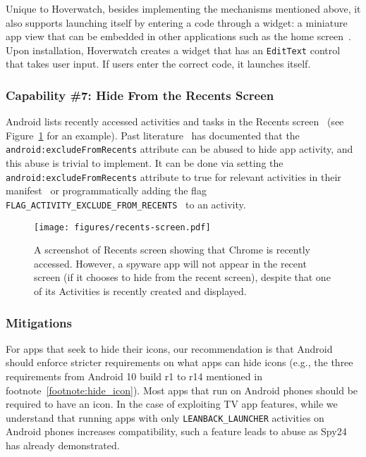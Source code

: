 \documentclass[sigconf,balance=false]{acmart}
\newcommand{\alex}[1]{\textcolor{chicagomaroon}{\noindent[AL: #1]}}
\newcommand{\alex}[1]{}
\begin{document}
Unique to Hoverwatch, besides implementing the mechanisms mentioned above, it also supports launching itself by entering a
code through a widget: a miniature app view that can be embedded in other
applications such as the home screen~\cite{Appwidge49:online}. Upon installation,
Hoverwatch creates a widget that has an \texttt{EditText} control that takes user input. If users
enter the correct code, it launches itself.



\subsubsection*{Capability \#7: Hide From the Recents Screen}

Android lists recently accessed activities and tasks in the Recents
screen~\cite{Recentss9:online} (see Figure~\ref{fig:recents_screen} for an
example). Past literature~\cite{shan2018self, zhou2020demystifying} has
documented that the \texttt{android:excludeFromRecents} attribute can be abused
to hide app activity, and this abuse is trivial to implement. It can be done via
setting the \texttt{android:excludeFromRecents} attribute to true for relevant
activities in their manifest~\cite{activity72:online} or programmatically adding
the flag
\texttt{FLAG\_ACTIVITY\_EXCLUDE\_FROM\_RECENTS}~\cite{IntentAn90:online} to an
activity.

\begin{figure}[t]
\centering
\texttt{[image: figures/recents-screen.pdf]}
\caption{A screenshot of Recents screen showing that Chrome is recently accessed. However, a spyware app will not appear in the recent screen (if it chooses to hide from the recent screen), despite that one of its Activities is recently created and displayed.}
\label{fig:recents_screen}
\end{figure}


\subsubsection{Mitigations}
For apps that seek to hide their icons, our recommendation is that Android should enforce stricter requirements on what apps can hide icons (e.g., the three requirements from Android 10 build r1 to r14 mentioned in footnote~\ref{footnote:hide_icon}).
Most apps that run on Android phones should be required to have an icon. In the case of exploiting TV app features, while we
understand that running apps with only \texttt{LEANBACK\_LAUNCHER} activities on
Android phones increases compatibility, such a feature leads to abuse as Spy24
has already demonstrated.
\end{document}

